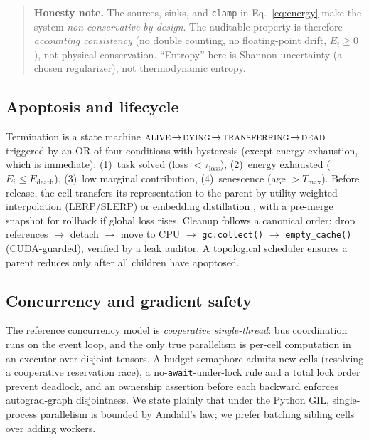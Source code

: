 \documentclass[11pt]{article}
\begin{document}
\begin{quotation}
\noindent\textbf{Honesty note.} The sources, sinks, and \texttt{clamp} in
Eq.~\eqref{eq:energy} make the system \emph{non-conservative by design}. The
auditable property is therefore \emph{accounting consistency} (no double
counting, no floating-point drift, $E_i\ge0$), not physical conservation.
``Entropy'' here is Shannon uncertainty (a chosen regularizer), not
thermodynamic entropy.
\end{quotation}

\subsection{Apoptosis and lifecycle}
Termination is a state machine
$\textsc{alive}\!\to\!\textsc{dying}\!\to\!\textsc{transferring}\!\to\!\textsc{dead}$
triggered by an OR of four conditions with hysteresis (except energy
exhaustion, which is immediate): (1)~task solved (loss $<\tau_{\text{loss}}$),
(2)~energy exhausted ($E_i\le E_{\text{death}}$), (3)~low marginal contribution,
(4)~senescence (age $>T_{\max}$). Before release, the cell transfers its
representation to the parent by utility-weighted interpolation (LERP/SLERP) or
embedding distillation \cite{hinton2015distill}, with a pre-merge snapshot for
rollback if global loss rises. Cleanup follows a canonical order: drop
references $\to$ detach $\to$ move to CPU $\to$ \texttt{gc.collect()} $\to$
\texttt{empty\_cache()} (CUDA-guarded), verified by a leak auditor. A topological
scheduler ensures a parent reduces only after all children have apoptosed.

\subsection{Concurrency and gradient safety}
The reference concurrency model is \emph{cooperative single-thread}: bus
coordination runs on the event loop, and the only true parallelism is per-cell
computation in an executor over disjoint tensors. A budget semaphore admits new
cells (resolving a cooperative reservation race), a no-\texttt{await}-under-lock
rule and a total lock order prevent deadlock, and an ownership assertion before
each backward enforces autograd-graph disjointness. We state plainly that under
the Python GIL, single-process parallelism is bounded by Amdahl's law; we prefer
batching sibling cells over adding workers.

\end{document}
